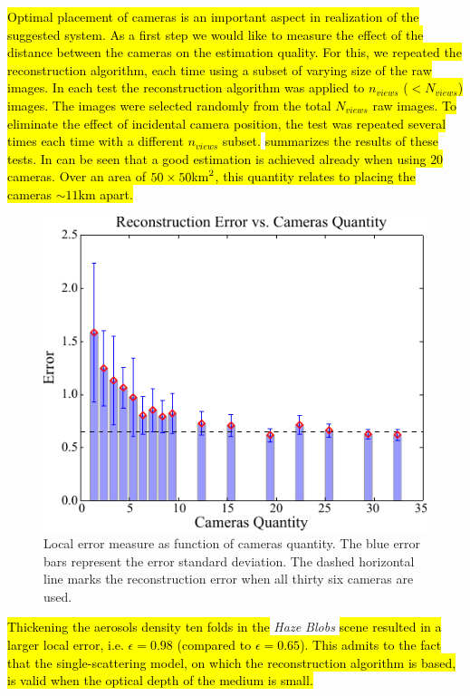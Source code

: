 \documentclass[10pt,letterpaper]{article}
\newcommand{\yoavcomment}[1]{}
\renewcommand{\yoavcomment}[1]{#1} %
\begin{document}
\hl{Optimal placement of cameras is an important aspect in realization
of the suggested system. As a first step we would like to measure the effect of
the distance between the cameras on the estimation quality. For this, we
repeated the reconstruction algorithm, each time using a subset of varying size
of the raw images. In each test the reconstruction algorithm was applied to $n_{views}$
($<N_{views}$) images. The images were selected randomly from the total $N_{views}$ raw images.
To eliminate the effect of incidental camera position, the test was repeated several
times each time with a different $n_{views}$ subset.} 
\hl{summarizes the results of these tests. In can be seen that a good estimation
is achieved already when using $20$ cameras. Over an area of $50\times 50{\rm km}^2$,
this quantity relates to placing the cameras $\sim11$km apart.}
\begin{figure}[h]
  \centering
  \yoavcomment{\includegraphics{images/error_vs_cameras.pdf}}
  \caption{\small Local error measure as function of cameras
    quantity. The blue error bars represent the error standard
    deviation. The dashed horizontal line marks the reconstruction
    error when all thirty six cameras are used.}
  \label{fig:error_vs_cameras}
\end{figure}

\hl{Thickening the aerosols density ten folds in the} {\em Haze Blobs} \hl{scene
resulted in a larger local error, i.e. $\epsilon=0.98$ (compared to $\epsilon=0.65$).
This admits to the fact that the single-scattering model, on which the reconstruction
algorithm is based, is valid when the optical depth of the medium is small.}
\end{document}
